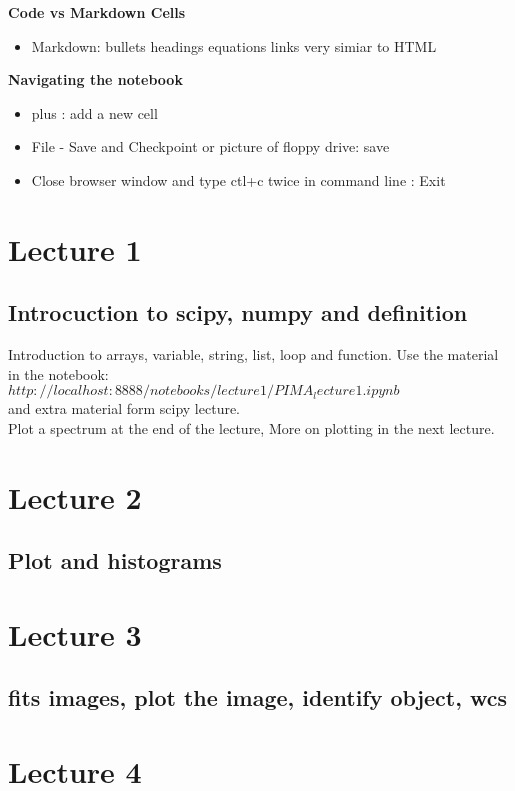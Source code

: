 \documentclass[11pt]{book}
\begin{document}
{ \bf Code vs Markdown Cells}
\begin{itemize}
\item Markdown:
\subitem bullets
\subitem headings
\subitem equations
\subitem links
\subitem very simiar to HTML
\end{itemize}
{\bf Navigating the notebook}
\begin{itemize}
\item plus : add a new cell
\item File - Save and Checkpoint or picture of floppy drive: save
\item Close browser window and type ctl+c twice in command line : Exit
\end{itemize}

\chapter{Lecture 1}
\section{Introcuction to scipy, numpy and definition}
Introduction to arrays, variable, string, list, loop and function.
Use the material in the notebook: \\
$http://localhost:8888/notebooks/lecture1/PIMA_lecture1.ipynb$ \\

and extra material form scipy lecture.\\
Plot a spectrum at the end of the lecture, More on plotting in the next lecture.

\chapter{Lecture 2}
\section{Plot and histograms}



\chapter{Lecture 3}
\section{fits images, plot the image, identify object, wcs}



\chapter{Lecture 4}
\end{document}
